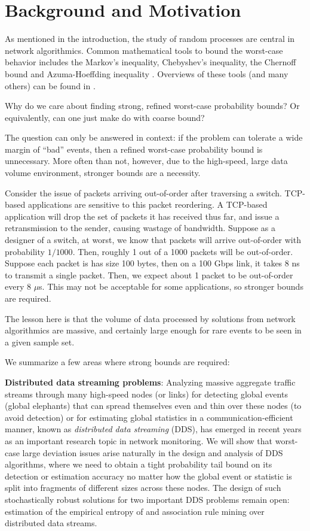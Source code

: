 \section{Background and Motivation}

As mentioned in the introduction, the study of random processes are central in network algorithmics. 
Common mathematical tools to bound the worst-case behavior includes the Markov's inequality,
Chebyshev's inequality, the Chernoff bound and 
Azuma-Hoeffding inequality \cite{Azuma67Martingale,Hoeffding63Bounded}. Overviews of these
tools (and many others) can be found in \cite{Alon04ProbMethod,MitzenmacherProb05,Raghavan95RandAlgo}.

Why do we care about finding strong, refined worst-case probability bounds? Or equivalently, can one just
make do with coarse bound?

The question can only be answered in context: if the problem can tolerate a wide margin of
``bad'' events, then a refined worst-case probability bound is unnecessary. More often than not, however,
due to the high-speed, large data volume environment, stronger bounds are a necessity.

Consider the issue of packets arriving out-of-order after traversing a switch. TCP-based applications
are sensitive to this packet reordering. A TCP-based application will drop the set of packets it has received thus far, and
issue a retransmission to the sender, causing wastage of bandwidth. Suppose as a designer of a switch, at 
worst, we know that packets will arrive out-of-order with probability $1/1000$. Then, roughly 1 out of a 
1000 packets will be out-of-order. Suppose each packet is has size 100 bytes, then on a 100 Gbps link,
it takes 8 ns to transmit a single packet. Then, we expect about 1 packet to be out-of-order every 8 
$\mu$s. This may not be acceptable for some applications, so stronger bounds are required.

The lesson here is that the volume of data processed by solutions from network algorithmics are massive,
and certainly large enough for rare events to be seen in a given sample set. 

We summarize a few areas where strong bounds are required:

\medskip
\noindent
\textbf{Distributed data streaming problems}:  Analyzing massive aggregate traffic streams through many high-speed nodes (or links) for detecting global events
(\eg global elephants) that can spread themselves even and thin over these nodes (to avoid detection) or for estimating global statistics
in a communication-efficient manner, known as {\it distributed data streaming} (DDS),  has
emerged in recent years as an important research topic in network monitoring.
We will show that worst-case large deviation issues arise naturally in the design and analysis
of DDS algorithms, where we need to obtain a tight
probability tail bound on its detection or estimation accuracy no matter how the global event or statistic is split into
fragments of different sizes across these nodes. The design of such stochastically robust solutions for 
two important DDS problems remain open: estimation of the empirical entropy of and association rule mining over distributed data streams.

